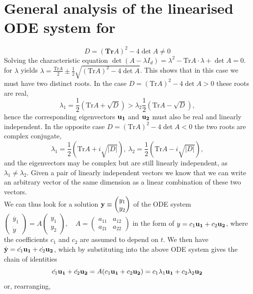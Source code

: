 \documentclass[11pt,a4paper,twoside]{article}
\begin{document}
\section{General analysis of the linearised ODE system for}
$$D = (\textbf{Tr}A)^2 - 4\det A \neq 0$$
Solving the characteristic equation $\det (A − \lambda I_d) = \lambda^2 − \text{Tr}A \cdot \lambda + \det A = 0$. for $\lambda$ yields $\lambda = \frac{\text{Tr}A}{2}\pm \frac{1}{2}\sqrt{(\text{Tr}A)^2 - 4\det A}$. This shows that in this case we must have two distinct roots. In the case $D = (\text{Tr}A)^2 − 4 \det A > 0$ these roots are real,
$$
\lambda_1 = \frac{1}{2}(\text{Tr}A + \sqrt{D}) > \lambda_2 \frac{1}{2}(\text{Tr}A - \sqrt{D}),
$$
hence the corresponding eigenvectors $\vb{u_1}$ and $\vb{u_2}$ must also be real and linearly independent. In the opposite case $D = (\text{Tr}A)^2 − 4 \det A < 0$ the two roots are complex conjugate,
$$
\lambda_1 = \frac{1}{2}(\text{Tr}A + i\sqrt{|D|}),\ \lambda_2 = \frac{1}{2}(\text{Tr}A - i\sqrt{|D|}),
$$
and the eigenvectors may be complex but are still linearly independent, as $\lambda_1 \neq \lambda_2$. Given a pair of linearly independent vectors we know that we can write an arbitrary vector of the same dimension as a linear combination of these two vectors.\\
We can thus look for a solution
$
\vb{y} \equiv
\begin{pmatrix}
	y_1\\
	y_2
\end{pmatrix}
$
of the ODE system
$
\begin{pmatrix}
	\dot{y_1}\\
	\dot{y}
\end{pmatrix}
= A
\begin{pmatrix}
	y_1\\
	y_2
\end{pmatrix},\quad
A =
\begin{pmatrix}
	a_{11} & a_{12}\\
	a_{21} & a_{22}
\end{pmatrix}
$
in the form of $y = c_1\vb{u_1} + c_2\vb{u_2}$, where the coefficients $c_1$ and $c_2$ are assumed to depend on $t$. We then have $\dot{\vb{y}} = \dot{c_1}\vb{u_1} + \dot{c_2}\vb{u_2}$, which by substituting into the above ODE system gives the chain of identities
\begin{equation}\label{4.10}
	\dot{c_1}\vb{u_1} + \dot{c_2}\vb{u_2} = A(c_1\vb{u_1} + c_2\vb{u_2}) = c_1\lambda_1\vb{u_1} + c_2\lambda_2\vb{u_2}
\end{equation}
or, rearranging,
\end{document}
